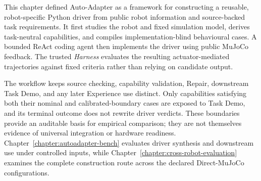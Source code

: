 This chapter defined Auto-Adapter as a framework for constructing a reusable,
robot-specific Python driver from public robot information and source-backed
task requirements. It first studies the robot and fixed simulation model,
derives task-neutral capabilities, and compiles implementation-blind
behavioural cases. A bounded ReAct coding agent then implements the driver
using public MuJoCo feedback. The trusted \emph{Harness} evaluates the
resulting actuator-mediated trajectories against fixed criteria rather than
relying on candidate output.

The workflow keeps source checking, capability validation, Repair, downstream
Task Demo, and any later Experience use distinct. Only capabilities satisfying
both their nominal and calibrated-boundary cases are exposed to Task Demo, and
its terminal outcome does not rewrite driver verdicts. These boundaries provide
an auditable basis for empirical comparison; they are not themselves evidence
of universal integration or hardware readiness.
Chapter~\ref{chapter:autoadapter-bench} evaluates driver synthesis and
downstream use under controlled inputs, while
Chapter~\ref{chapter:cross-robot-evaluation} examines the complete construction
route across the declared Direct-MuJoCo configurations.
